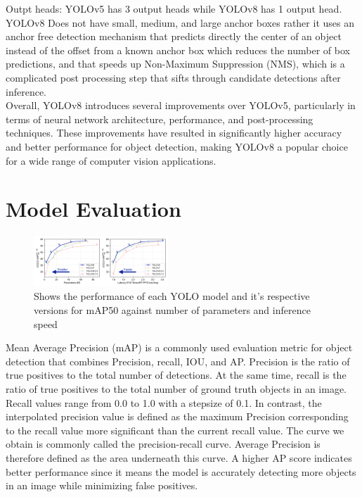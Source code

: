 \documentclass[10pt,twocolumn,letterpaper]{article}
\begin{document}
Outpt heads: YOLOv5 has 3 output heads while YOLOv8 has 1 output head. YOLOv8 Does not have small, medium, and large anchor boxes rather it uses an anchor free detection mechanism that predicts directly the center of an object instead of the offset from a known anchor box which reduces the number of box predictions, and that speeds up Non-Maximum Suppression (NMS), which is a complicated post processing step that sifts through candidate detections after inference.\\
Overall, YOLOv8 introduces several improvements over YOLOv5, particularly in terms of neural network architecture, performance, and post-processing techniques. These improvements have resulted in significantly higher accuracy and better performance for object detection, making YOLOv8 a popular choice for a wide range of computer vision applications.\\

\section{Model Evaluation}

\begin{figure}[h]
    \centering
    \includegraphics[width=0.45\textwidth]{figures/yolo-comparison-plots.png}
    \caption{Shows the performance of each YOLO model and it's respective versions for mAP50 against number of parameters and inference speed}
    \label{fig:my_label}
\end{figure}

Mean Average Precision (mAP) is a commonly used evaluation metric for object detection that combines Precision, recall, IOU, and AP. Precision is the ratio of true positives to the total number of detections. At the same time, recall is the ratio of true positives to the total number of ground truth objects in an image. Recall values range from 0.0 to 1.0 with a stepsize of 0.1. In contrast, the interpolated precision value is defined as the maximum Precision corresponding to the recall value more significant than the current recall value. The curve we obtain is commonly called the precision-recall curve. Average Precision is therefore defined as the area underneath this curve. A higher AP score indicates better performance since it means the model is accurately detecting more objects in an image while minimizing false positives. 
\end{document}
